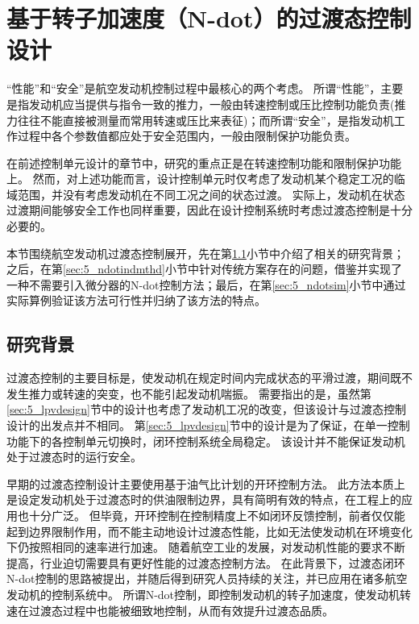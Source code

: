\documentclass{article}
\begin{document}
\section{基于转子加速度（N-dot）的过渡态控制设计}
\label{sec:5_transientctrl}

“性能”和“安全”是航空发动机控制过程中最核心的两个考虑。
所谓“性能”，主要是指发动机应当提供与指令一致的推力，一般由转速控制或压比控制功能负责(推力往往不能直接被测量而常用转速或压比来表征)；而所谓“安全”，是指发动机工作过程中各个参数值都应处于安全范围内，一般由限制保护功能负责。

在前述控制单元设计的章节中，研究的重点正是在转速控制功能和限制保护功能上。
然而，对上述功能而言，设计控制单元时仅考虑了发动机某个稳定工况的临域范围，并没有考虑发动机在不同工况之间的状态过渡。
实际上，发动机在状态过渡期间能够安全工作也同样重要，因此在设计控制系统时考虑过渡态控制是十分必要的。

本节围绕航空发动机过渡态控制展开，先在第\ref{sec:5_ndotbg}小节中介绍了相关的研究背景；之后，在第\ref{sec:5_ndotindmthd}小节中针对传统方案存在的问题，借鉴并实现了一种不需要引入微分器的N-dot控制方法；最后，在第\ref{sec:5_ndotsim}小节中通过实际算例验证该方法可行性并归纳了该方法的特点。

\subsection{研究背景}
\label{sec:5_ndotbg}

过渡态控制的主要目标是，使发动机在规定时间内完成状态的平滑过渡，期间既不发生推力或转速的突变，也不能引起发动机喘振。
需要指出的是，虽然第\ref{sec:5_lpvdesign}节中的设计也考虑了发动机工况的改变，但该设计与过渡态控制设计的出发点并不相同。
第\ref{sec:5_lpvdesign}节中的设计是为了保证，在单一控制功能下的各控制单元切换时，闭环控制系统全局稳定。
该设计并不能保证发动机处于过渡态时的运行安全。

早期的过渡态控制设计主要使用基于油气比计划的开环控制方法\cite{Jaw2005Propulsion}。
此方法本质上是设定发动机处于过渡态时的供油限制边界，具有简明有效的特点，在工程上的应用也十分广泛\cite{Kong2013extrapolation,Lu2012new,Jiang2005Digital}。
但毕竟，开环控制在控制精度上不如闭环反馈控制，前者仅仅能起到边界限制作用，而不能主动地设计过渡态性能，比如无法使发动机在环境变化下仍按照相同的速率进行加速。
随着航空工业的发展，对发动机性能的要求不断提高，行业迫切需要具有更好性能的过渡态控制方法。
在此背景下，过渡态闭环N-dot控制的思路被提出\cite{Merrill1984role}，并随后得到研究人员持续的关注\cite{H.AustinSpang1999Control,Wang2015PI}，并已应用在诸多航空发动机的控制系统中。
所谓N-dot控制，即控制发动机的转子加速度，使发动机转速在过渡态过程中也能被细致地控制，从而有效提升过渡态品质。
\end{document}
